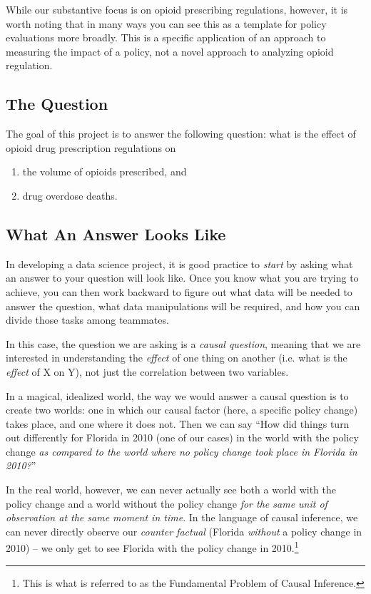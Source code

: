 \documentclass[12pt]{article}
\begin{document}
While our substantive focus is on opioid prescribing regulations, however, it is worth noting that in many ways you can see this as a template for policy evaluations more broadly. This is a specific application of an approach to measuring the impact of a policy, not a novel approach to analyzing opioid regulation.

\subsection*{The Question}

The goal of this project is to answer the following question: what is the effect of opioid drug prescription regulations on

\begin{enumerate}
  \item the volume of opioids prescribed, and
  \item drug overdose deaths.
\end{enumerate}

\subsection*{What An Answer Looks Like}

In developing a data science project, it is good practice to \emph{start} by asking what an answer to your question will look like. Once you know what you are trying to achieve, you can then work backward to figure out what data will be needed to answer the question, what data manipulations will be required, and how you can divide those tasks among teammates.

In this case, the question we are asking is a \emph{causal question}, meaning that we are interested in understanding the \emph{effect} of one thing on another (i.e. what is the \emph{effect} of X on Y), not just the correlation between two variables.

In a magical, idealized world, the way we would answer a causal question is to create two worlds: one in which our causal factor (here, a specific policy change) takes place, and one where it does not. Then we can say ``How did things turn out differently for Florida in 2010 (one of our cases) in the world with the policy change \emph{as compared to the world where no policy change took place in Florida in 2010?}''

In the real world, however, we can never actually see both a world with the policy change and a world without the policy change \emph{for the same unit of observation at the same moment in time}. In the language of causal inference, we can never directly observe our \emph{counter factual} (Florida \emph{without} a policy change in 2010) -- we only get to see Florida with the policy change in 2010.\footnote{This is what is referred to as the Fundamental Problem of Causal Inference.}
\end{document}
